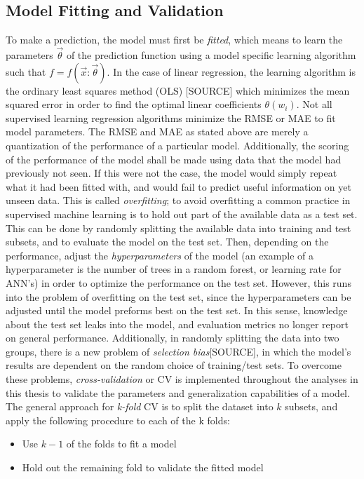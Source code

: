 \documentclass[a4paper, twoside, final, 12pt]{article}
\begin{document}
\subsection{Model Fitting and Validation}
To make a prediction, the model must first be \textit{fitted}, which means to learn the parameters $\vec{\theta}$ of the prediction function using a model specific learning algorithm such that $f = f(\vec{x}: \vec{\theta})$.
In the case of linear regression, the learning algorithm is the ordinary least squares method (OLS) [SOURCE] which minimizes the mean squared error in order to find the optimal linear coefficients $\theta(w_i)$.
Not all supervised learning regression algorithms minimize the RMSE or MAE to fit model parameters.
The RMSE and MAE as stated above are merely a quantization of the performance of a particular model.
Additionally, the scoring of the performance of the model shall be made using data that the model had previously not seen.
If this were not the case, the model would simply repeat what it had been fitted with, and would fail to predict useful information on yet unseen data.
This is called \textit{overfitting}; to avoid overfitting a common practice in supervised machine learning is to hold out part of the available data as a test set.
This can be done by randomly splitting the available data into training and test subsets, and to evaluate the model on the test set.
Then, depending on the performance, adjust the \textit{hyperparameters} of the model (an example of a hyperparameter is the number of trees in a random forest, or learning rate for ANN's) in order to optimize the performance on the test set.
However, this runs into the problem of overfitting on the test set, since the hyperparameters can be adjusted until the model preforms best on the test set.
In this sense, knowledge about the test set leaks into the model, and evaluation metrics no longer report on general performance.
Additionally, in randomly splitting the data into two groups, there is a new problem of \textit{selection bias}[SOURCE], in which the model's results are dependent on the random choice of training/test sets.
To overcome these problems, \textit{cross-validation} or CV is implemented throughout the analyses in this thesis to validate the parameters and generalization capabilities of a model.
The general approach for \textit{k-fold} CV is to split the dataset into $k$ subsets, and apply the following procedure to each of the k folds:
\begin{itemize}
	\item Use $k-1$ of the folds to fit a model 
	\item Hold out the remaining fold to validate the fitted model
\end{itemize}
\end{document}
